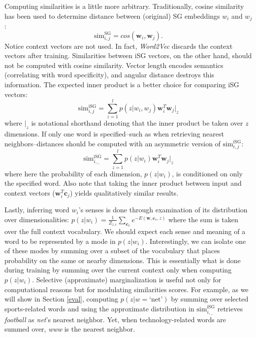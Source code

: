 \documentclass{article} %
\begin{document}
Computing similarities is a little more arbitrary.  Traditionally, cosine similarity has been used to determine distance between (original) SG embeddings $w_i$ and $w_j$: \begin{equation}\label{w2v_sim}\text{sim}_{i,j}^{\text{SG}} = cos(\mathbf{w}_{i}, \mathbf{w}_{j}).\end{equation}  Notice context vectors are not used.  In fact, \textit{Word2Vec} discards the context vectors after training.  Similarities between iSG vectors, on the other hand, should not be computed with cosine similarity.  Vector length encodes semantics (correlating with word specificity), and angular distance destroys this information.  The expected inner product is a better choice for comparing iSG vectors: \begin{equation}\label{iw2v_sim1}\text{sim}_{i,j}^{\text{iSG}} = \sum_{z=1}^{l} p(z | w_{i},w_{j}) \mathbf{w}_{i}^{T} \mathbf{w}_{j}\vert_{z}\end{equation} where $\vert_{z}$ is notational shorthand denoting that the inner product be taken over $z$ dimensions.  If only one word is specified--such as when retrieving nearest neighbors--distances should be computed with an asymmetric version of $\text{sim}_{i,j}^{\text{iSG}}$: \begin{equation}\label{iw2v_sim2}\text{sim}_{i,\text{\_}}^{\text{iSG}} = \sum_{z=1}^{l} p(z | w_{i}) \mathbf{w}_{i}^{T} \mathbf{w}_{j}\vert_{z} \end{equation} where here the probability of each dimension, $p(z | w_{i})$, is conditioned on only the specified word.  Also note that taking the inner product between input and context vectors ($\mathbf{w}_{i}^{T} \mathbf{c}_{j}$) yields qualitatively similar results.

Lastly, inferring word $w_{i}$'s senses is done through examination of its distribution over dimensionalities: $p(z|w_{i}) = \frac{1}{Z_{z,c}} \sum_{\mathbf{c}_{v}} e^{ -E(\mathbf{w}, \mathbf{c}_{v}, z)}$ where the sum is taken over the full context vocabulary.  We should expect each sense and meaning of a word to be represented by a mode in $p(z|w_{i})$.  Interestingly, we can isolate one of these modes by summing over a subset of the vocabulary that places probability on the same or nearby dimensions.  This is essentially what is done during training by summing over the current context only when computing $p(z|w_{i})$.  Selective (approximate) marginalization is useful not only for computational reasons but for modulating similarities scores.  For example, as we will show in Section \ref{eval}, computing $p(z|w=\text{`net'})$ by summing over selected sports-related words and using the approximate distribution in $\text{sim}_{i,\text{\_}}^{\text{iSG}}$ retrieves \textit{football} as \textit{net}'s nearest neighbor.  Yet, when technology-related words are summed over, \textit{www} is the nearest neighbor.   
\end{document}
